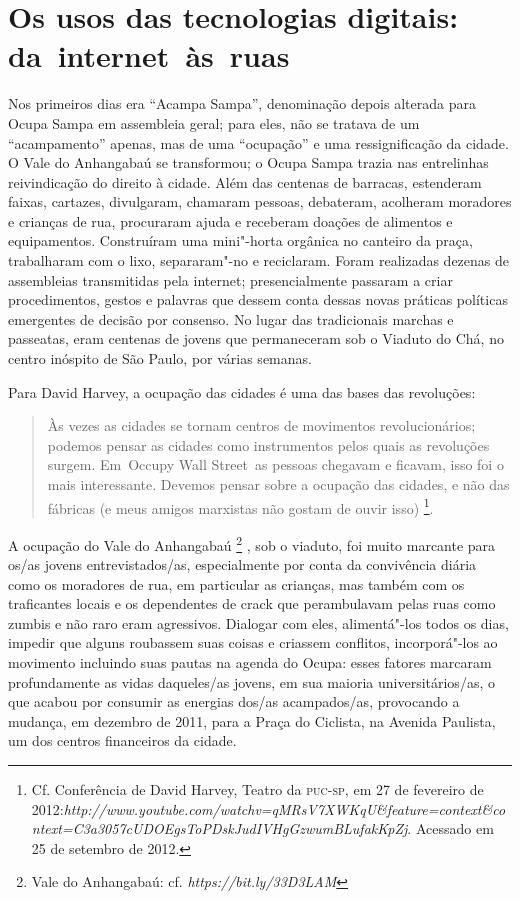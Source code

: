 \section{Os usos das tecnologias digitais: da~internet~às~ruas}

Nos primeiros dias era ``Acampa Sampa'', denominação depois alterada
para Ocupa Sampa em assembleia geral; para eles, não se tratava de um
``acampamento'' apenas, mas de uma ``ocupação'' e uma ressignificação da
cidade. O Vale do Anhangabaú se transformou; o Ocupa Sampa trazia nas
entrelinhas reivindicação do direito à cidade. Além das centenas de
barracas, estenderam faixas, cartazes, divulgaram, chamaram pessoas,
debateram, acolheram moradores e crianças de rua, procuraram ajuda e
receberam doações de alimentos e equipamentos. Construíram uma
mini"-horta orgânica no canteiro da praça, trabalharam com o lixo,
separaram"-no e reciclaram. Foram realizadas dezenas de assembleias
transmitidas pela internet; presencialmente passaram a criar
procedimentos, gestos e palavras que dessem conta dessas novas práticas
políticas emergentes de decisão por consenso. No lugar das tradicionais
marchas e passeatas, eram centenas de jovens que permaneceram sob o
Viaduto do Chá, no centro inóspito de São Paulo, por várias semanas.

Para David Harvey, a ocupação das cidades é uma das bases das
revoluções:

\begin{quote}
Às vezes as cidades se tornam centros de movimentos revolucionários;
podemos pensar as cidades como instrumentos pelos quais as revoluções
surgem. Em~Occupy Wall Street~as pessoas chegavam e ficavam, isso foi o
mais interessante. Devemos pensar sobre a ocupação das cidades, e não
das fábricas (e meus amigos marxistas não gostam de ouvir isso)
\footnote{Cf. Conferência de David Harvey, Teatro da \textsc{puc}-\textsc{sp}, em 27 de
  fevereiro de
  2012:\emph{http://www.youtube.com/watchv=qMRsV7XWKqU\&feature=context\&context=C3a3057cUDOEgsToPDskJudIVHgGzwumBLufakKpZj}. %
  Acessado em 25 de setembro de 2012.}.
\end{quote}

A ocupação do Vale do Anhangabaú \footnote{Vale do Anhangabaú: cf.
  \emph{https://bit.ly/33D3LAM}} , sob o
viaduto, foi muito marcante para os/as jovens entrevistados/as,
especialmente por conta da convivência diária como os moradores de rua,
em particular as crianças, mas também com os traficantes locais e os
dependentes de crack que perambulavam pelas ruas como zumbis e não raro
eram agressivos. Dialogar com eles, alimentá"-los todos os dias, impedir
que alguns roubassem suas coisas e criassem conflitos, incorporá"-los ao
movimento incluindo suas pautas na agenda do Ocupa: esses fatores
marcaram profundamente as vidas daqueles/as jovens, em sua maioria
universitários/as, o que acabou por consumir as energias dos/as
acampados/as, provocando a mudança, em dezembro de 2011, para a Praça do
Ciclista, na Avenida Paulista, um dos centros financeiros da cidade.

